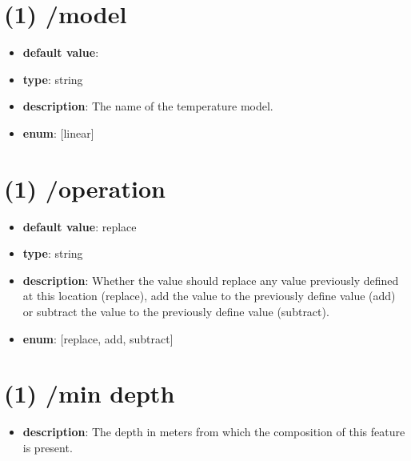 \section{(1) /model}
\begin{itemize}[leftmargin=1em]\item {\bf default value}: 
\item {\bf type}: string
\item {\bf description}: The name of the temperature model.
\item {\bf enum}: [linear]\end{itemize}\section{(1) /operation}
\begin{itemize}[leftmargin=1em]\item {\bf default value}: replace
\item {\bf type}: string
\item {\bf description}: Whether the value should replace any value previously defined at this location (replace), add the value to the previously define value (add) or subtract the value to the previously define value (subtract).
\item {\bf enum}: [replace, add, subtract]\end{itemize}\section{(1) /min depth}
\begin{itemize}[leftmargin=1em]\item {\bf description}: The depth in meters from which the composition of this feature is present.
\end{itemize}
